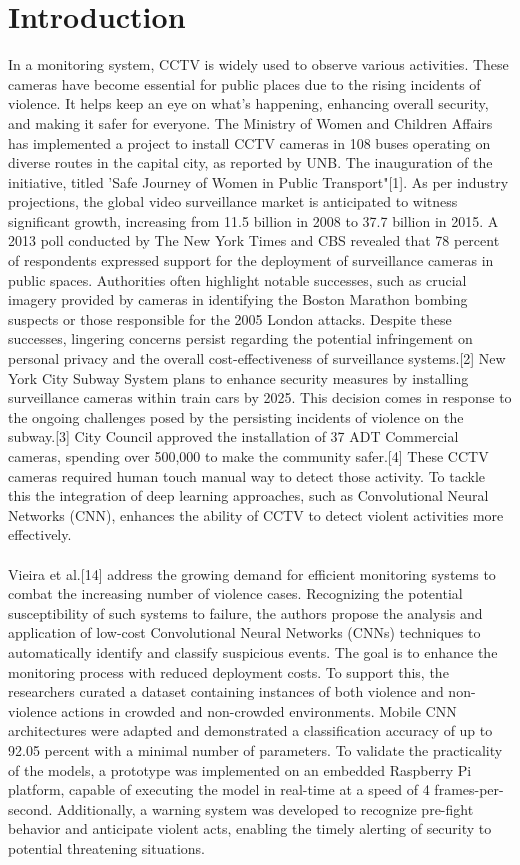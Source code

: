 \documentclass[conference]{IEEEtran}
\begin{document}
\section{Introduction}
In a monitoring system, CCTV is widely used to observe various activities. These cameras have become essential for public places due to the rising incidents of violence. It helps keep an eye on what's happening, enhancing overall security, and making it safer for everyone. The Ministry of Women and Children Affairs has implemented a project to install CCTV cameras in 108 buses operating on diverse routes in the capital city, as reported by UNB. The inauguration of the initiative, titled 'Safe Journey of Women in Public Transport"[1]. As per industry projections, the global video surveillance market is anticipated to witness significant growth, increasing from 11.5 
 billion in 2008 to 37.7 billion in 2015. A 2013 poll conducted by The New York Times and CBS revealed that 78 percent of respondents expressed support for the deployment of surveillance cameras in public spaces. Authorities often highlight notable successes, such as crucial imagery provided by cameras in identifying the Boston Marathon bombing suspects or those responsible for the 2005 London attacks. Despite these successes, lingering concerns persist regarding the potential infringement on personal privacy and the overall cost-effectiveness of surveillance systems.[2] New York City Subway System plans to enhance security measures by installing surveillance cameras within train cars by 2025. This decision comes in response to the ongoing challenges posed by the persisting incidents of violence on the subway.[3] City Council approved the installation of 37 ADT Commercial cameras, spending over 500,000 to make the community safer.[4] These CCTV cameras required human touch manual way to detect those activity. To tackle this the integration of deep learning approaches, such as Convolutional Neural Networks (CNN), enhances the ability of CCTV to detect violent activities more effectively.\\
 \\Vieira et al.[14] address the growing demand for efficient monitoring systems to combat the increasing number of violence cases. Recognizing the potential susceptibility of such systems to failure, the authors propose the analysis and application of low-cost Convolutional Neural Networks (CNNs) techniques to automatically identify and classify suspicious events. The goal is to enhance the monitoring process with reduced deployment costs. To support this, the researchers curated a dataset containing instances of both violence and non-violence actions in crowded and non-crowded environments. Mobile CNN architectures were adapted and demonstrated a classification accuracy of up to 92.05 percent with a minimal number of parameters. To validate the practicality of the models, a prototype was implemented on an embedded Raspberry Pi platform, capable of executing the model in real-time at a speed of 4 frames-per-second. Additionally, a warning system was developed to recognize pre-fight behavior and anticipate violent acts, enabling the timely alerting of security to potential threatening situations.
\end{document}
